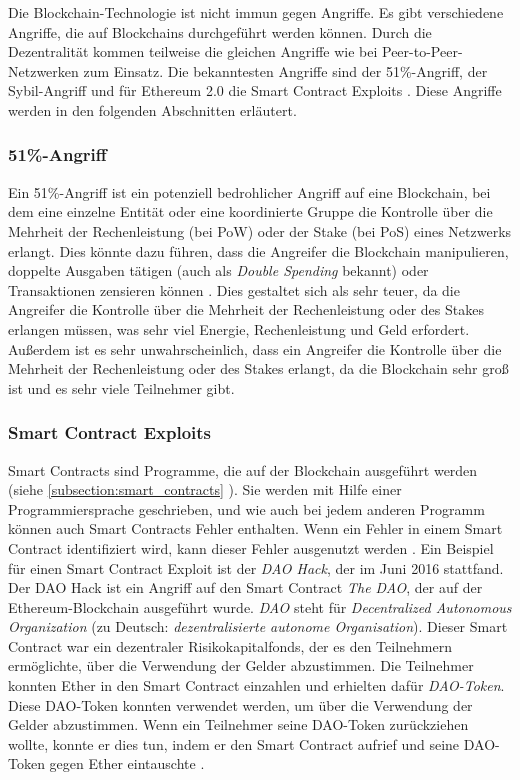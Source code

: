 Die Blockchain-Technologie ist nicht immun gegen Angriffe. Es gibt verschiedene Angriffe, die auf Blockchains durchgeführt werden können. Durch die Dezentralität kommen teilweise die gleichen Angriffe wie bei Peer-to-Peer-Netzwerken zum Einsatz. Die bekanntesten Angriffe sind der 51\%-Angriff, der Sybil-Angriff und für Ethereum 2.0 die Smart Contract Exploits \Parencites[S. 95034]{Nam_51PercentAttacks}[S. 251]{Douceur_SybilAttack}. Diese Angriffe werden in den folgenden Abschnitten erläutert.

\subsubsection{51\%-Angriff}

Ein 51\%-Angriff ist ein potenziell bedrohlicher Angriff auf eine Blockchain, bei dem eine einzelne Entität oder eine koordinierte Gruppe die Kontrolle über die Mehrheit der Rechenleistung (bei PoW) oder der Stake (bei PoS) eines Netzwerks erlangt. Dies könnte dazu führen, dass die Angreifer die Blockchain manipulieren, doppelte Ausgaben tätigen (auch als \textit{Double Spending} bekannt) oder Transaktionen zensieren können \Parencites[S. 95034]{Nam_51PercentAttacks}[S. 2]{Rosenfeld_DoubleSpending}. Dies gestaltet sich als sehr teuer, da die Angreifer die Kontrolle über die Mehrheit der Rechenleistung oder des Stakes erlangen müssen, was sehr viel Energie, Rechenleistung und Geld erfordert. Außerdem ist es sehr unwahrscheinlich, dass ein Angreifer die Kontrolle über die Mehrheit der Rechenleistung oder des Stakes erlangt, da die Blockchain sehr groß ist und es sehr viele Teilnehmer gibt.

\subsubsection{Smart Contract Exploits}

Smart Contracts sind Programme, die auf der Blockchain ausgeführt werden (siehe \ref{subsection:smart_contracts} \textit{}). Sie werden mit Hilfe einer Programmiersprache geschrieben, und wie auch bei jedem anderen Programm können auch Smart Contracts Fehler enthalten. Wenn ein Fehler in einem Smart Contract identifiziert wird, kann dieser Fehler ausgenutzt werden \Parencite[S. 1-2]{Perez_SmartContractVulnerabilities}. Ein Beispiel für einen Smart Contract Exploit ist der \textit{DAO Hack}, der im Juni 2016 stattfand. Der DAO Hack ist ein Angriff auf den Smart Contract \textit{The DAO}, der auf der Ethereum-Blockchain ausgeführt wurde. \textit{DAO} steht für \textit{Decentralized Autonomous Organization} (zu Deutsch: \textit{dezentralisierte autonome Organisation}). Dieser Smart Contract war ein dezentraler Risikokapitalfonds, der es den Teilnehmern ermöglichte, über die Verwendung der Gelder abzustimmen. Die Teilnehmer konnten Ether in den Smart Contract einzahlen und erhielten dafür \textit{DAO-Token}. Diese DAO-Token konnten verwendet werden, um über die Verwendung der Gelder abzustimmen. Wenn ein Teilnehmer seine DAO-Token zurückziehen wollte, konnte er dies tun, indem er den Smart Contract aufrief und seine DAO-Token gegen Ether eintauschte \parencite{Pratap_DAOHack}. 

